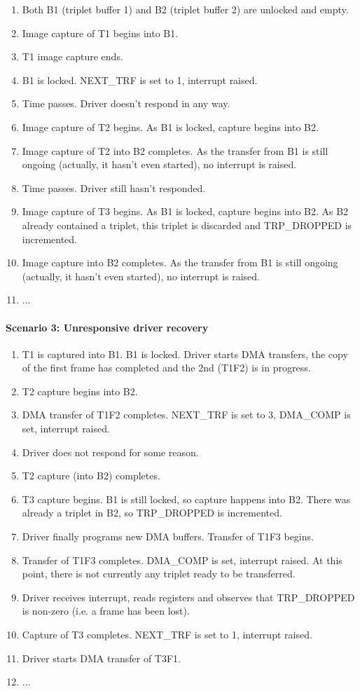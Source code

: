 \documentclass[12pt]{article}
\begin{document}
\begin{enumerate}
\item Both B1 (triplet buffer 1) and B2 (triplet buffer 2) are unlocked and empty.
\item Image capture of T1 begins into B1.
\item T1 image capture ends.
\item B1 is locked. NEXT\_TRF is set to 1, interrupt raised.
\item Time passes. Driver doesn't respond in any way.
\item Image capture of T2 begins. As B1 is locked, capture begins into B2.
\item Image capture of T2 into B2 completes. As the transfer from B1 is still ongoing (actually, it hasn't even started), no interrupt is raised.
\item Time passes. Driver still hasn't responded.
\item Image capture of T3 begins. As B1 is locked, capture begins into B2. As B2 already contained a triplet, this triplet is discarded and TRP\_DROPPED is incremented.
\item Image capture into B2 completes. As the transfer from B1 is still ongoing (actually, it hasn't even started), no interrupt is raised.
\item ...
\end{enumerate}

\paragraph{Scenario 3: Unresponsive driver recovery}

\begin{enumerate}
\item T1 is captured into B1. B1 is locked. Driver starts DMA transfers, the copy of the first frame has completed and the 2nd (T1F2) is in progress.
\item T2 capture begins into B2.
\item DMA transfer of T1F2 completes. NEXT\_TRF is set to 3, DMA\_COMP is set, interrupt raised.
\item Driver does not respond for some reason.
\item T2 capture (into B2) completes.
\item T3 capture begins. B1 is still locked, so capture happens into B2. There was already a triplet in B2, so TRP\_DROPPED is incremented.
\item Driver finally programs new DMA buffers. Transfer of T1F3 begins.
\item Transfer of T1F3 completes. DMA\_COMP is set, interrupt raised. At this point, there is not currently any triplet ready to be transferred.
\item Driver receives interrupt, reads registers and observes that TRP\_DROPPED is non-zero (i.e. a frame has been lost).
\item Capture of T3 completes. NEXT\_TRF is set to 1, interrupt raised.
\item Driver starts DMA transfer of T3F1.
\item ...
\end{enumerate}
\end{document}
